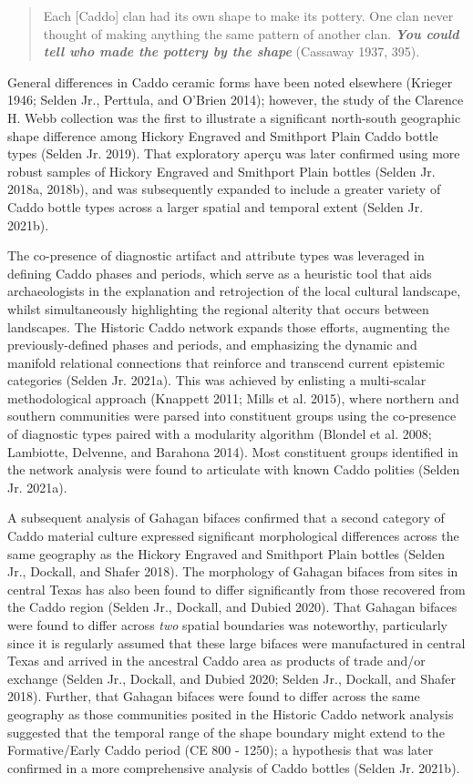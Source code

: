 \documentclass[smallextended]{svjour3}       %
\begin{document}
\begin{quote}
Each {[}Caddo{]} clan had its own shape to make its pottery. One clan
never thought of making anything the same pattern of another clan.
\emph{\textbf{You could tell who made the pottery by the shape}}
(Cassaway 1937, 395).
\end{quote}

General differences in Caddo ceramic forms have been noted elsewhere
(Krieger 1946; Selden Jr., Perttula, and O'Brien 2014); however, the
study of the Clarence H. Webb collection was the first to illustrate a
significant north-south geographic shape difference among Hickory
Engraved and Smithport Plain Caddo bottle types (Selden Jr. 2019). That
exploratory aperçu was later confirmed using more robust samples of
Hickory Engraved and Smithport Plain bottles (Selden Jr. 2018a, 2018b),
and was subsequently expanded to include a greater variety of Caddo
bottle types across a larger spatial and temporal extent (Selden Jr.
2021b).

The co-presence of diagnostic artifact and attribute types was leveraged
in defining Caddo phases and periods, which serve as a heuristic tool
that aids archaeologists in the explanation and retrojection of the
local cultural landscape, whilst simultaneously highlighting the
regional alterity that occurs between landscapes. The Historic Caddo
network expands those efforts, augmenting the previously-defined phases
and periods, and emphasizing the dynamic and manifold relational
connections that reinforce and transcend current epistemic categories
(Selden Jr. 2021a). This was achieved by enlisting a multi-scalar
methodological approach (Knappett 2011; Mills et al. 2015), where
northern and southern communities were parsed into constituent groups
using the co-presence of diagnostic types paired with a modularity
algorithm (Blondel et al. 2008; Lambiotte, Delvenne, and Barahona 2014).
Most constituent groups identified in the network analysis were found to
articulate with known Caddo polities (Selden Jr. 2021a).

A subsequent analysis of Gahagan bifaces confirmed that a second
category of Caddo material culture expressed significant morphological
differences across the same geography as the Hickory Engraved and
Smithport Plain bottles (Selden Jr., Dockall, and Shafer 2018). The
morphology of Gahagan bifaces from sites in central Texas has also been
found to differ significantly from those recovered from the Caddo region
(Selden Jr., Dockall, and Dubied 2020). That Gahagan bifaces were found
to differ across \emph{two} spatial boundaries was noteworthy,
particularly since it is regularly assumed that these large bifaces were
manufactured in central Texas and arrived in the ancestral Caddo area as
products of trade and/or exchange (Selden Jr., Dockall, and Dubied 2020;
Selden Jr., Dockall, and Shafer 2018). Further, that Gahagan bifaces
were found to differ across the same geography as those communities
posited in the Historic Caddo network analysis suggested that the
temporal range of the shape boundary might extend to the Formative/Early
Caddo period (CE 800 - 1250); a hypothesis that was later confirmed in a
more comprehensive analysis of Caddo bottles (Selden Jr. 2021b).
\end{document}
